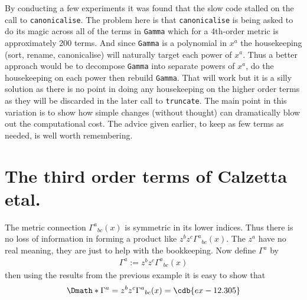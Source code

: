 \documentclass[a4paper,12pt]{article}
\numberwithin{equation}{section}%
\begin{document}
By conducting a few experiments it was found that the slow code stalled on the call to
\verb|canonicalise|. The problem here is that \verb|canonicalise| is being asked to do its
magic across all of the terms in \verb|Gamma| which for a 4th-order metric is approximately
200 terms. And since \verb|Gamma| is a polynomial in $x^{a}$ the housekeeping (sort, rename,
canonicalise) will naturally target each power of $x^{a}$. Thus a better approach would be
to decompose \verb|Gamma| into separate powers of $x^{a}$, do the housekeeping on each power
then rebuild \verb|Gamma|. That will work but it is a silly solution as there is no point in
doing any housekeeping on the higher order terms as they will be discarded in the later call
to \verb|truncate|. The main point in this variation is to show how simple changes (without
thought) can dramatically blow out the computational cost. The advice given earlier, to keep
as few terms as needed, is well worth remembering.

\clearpage

\section{The third order terms of Calzetta etal.}
\label{sec:ex-12}
\ResetCounters



The metric connection $\Gamma^{a}{}_{bc}(x)$ is symmetric in its lower indices. Thus there is
no loss of information in forming a product like $z^{b} z^{c} \Gamma^{a}{}_{bc}(x)$. The
$z^{a}$ have no real meaning, they are just to help with the bookkeeping. Now define
$\Gamma^{a}$ by \begin{align*}
   \Gamma^{a} := z^{b} z^{c} \Gamma^{a}{}_{bc}(x)
\end{align*}
then using the results from the previous example it is easy to show that
\begin{dgroup*}[spread=5pt]
   \Dmath*{ \Gamma^{a} = z^{b} z^{c} \Gamma^{a}{}_{bc}(x) = \cdb{ex-12.305} }
\end{dgroup*}
\end{document}
